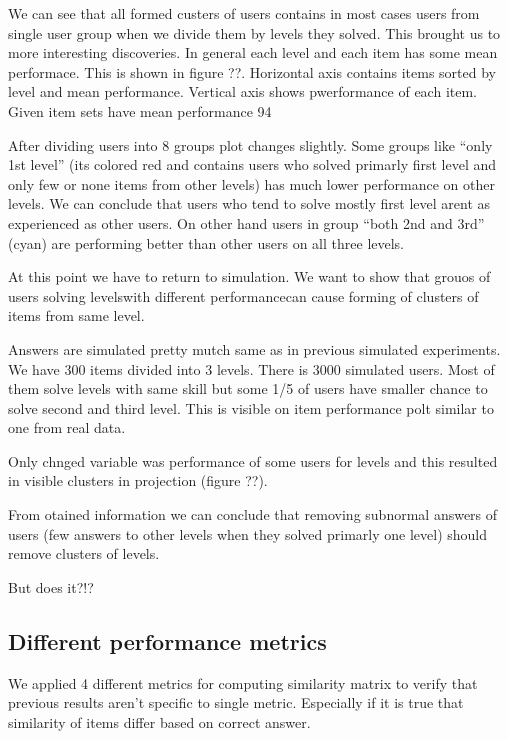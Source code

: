 \documentclass[
  digital, %
  table,   %
  nolof,     %
  nolot,     %
  nocover
]{fithesis3}
\begin{document}
We can see that all formed custers of users contains in most cases users
from single user group when we divide them by levels they solved. This
brought us to more interesting discoveries. In general each level and
each item has some mean performace. This is shown in figure ??.
Horizontal axis contains items sorted by level and mean performance.
Vertical axis shows pwerformance of each item. Given item sets have mean
performance 94%

After dividing users into 8 groups plot changes slightly. Some groups
like ``only 1st level'' (its colored red and contains users who solved
primarly first level and only few or none items from other levels) has
much lower performance on other levels. We can conclude that users who
tend to solve mostly first level arent as experienced as other users. On
other hand users in group ``both 2nd and 3rd'' (cyan) are performing
better than other users on all three levels.

At this point we have to return to simulation. We want to show that
grouos of users solving levelswith different performancecan cause
forming of clusters of items from same level.

Answers are simulated pretty mutch same as in previous simulated
experiments. We have 300 items divided into 3 levels. There is 3000
simulated users. Most of them solve levels with same skill but some 1/5
of users have smaller chance to solve second and third level. This is
visible on item performance polt similar to one from real data.

Only chnged variable was performance of some users for levels and this
resulted in visible clusters in projection (figure ??).

From otained information we can conclude that removing subnormal answers
of users (few answers to other levels when they solved primarly one
level) should remove clusters of levels.

But does it?!?

\subsection{Different performance
metrics}\label{different-performance-metrics}


We applied 4 different metrics for computing similarity matrix to verify
that previous results aren't specific to single metric. Especially if it
is true that similarity of items differ based on correct answer.
\end{document}

